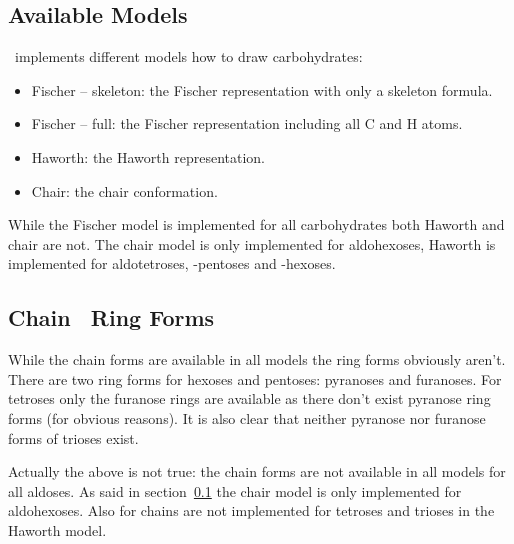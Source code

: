 \documentclass[load-preamble+,scrartcl={DIV10}]{cnltx-doc}
\begin{document}
\subsection{Available Models}\label{sec:available-models}

\carbohydrates\ implements different models how to draw carbohydrates:
\begin{itemize}
  \item Fischer -- skeleton: the Fischer representation with only a skeleton
    formula.
  \item Fischer -- full: the Fischer representation including all C and H
    atoms.
  \item Haworth: the Haworth representation.
  \item Chair: the chair conformation.
\end{itemize}

While the Fischer model is implemented for all carbohydrates both Haworth and
chair are not.  The chair model is only implemented for aldohexoses, Haworth
is implemented for aldotetroses, -pentoses and -hexoses.

\begin{example}
  \glucose[model={fischer=skeleton}]
  \glucose[model={fischer=full}]
  \setatomsep{2.5em}
  \glucose[model=haworth]
  \glucose[model=chair]
\end{example}

\subsection{Chain \vs\ Ring Forms}

While the chain forms are available in all models the ring forms obviously
aren't.  There are two ring forms for hexoses and pentoses: pyranoses and
furanoses.  For tetroses only the furanose rings are available as there don't
exist pyranose ring forms (for obvious reasons).  It is also clear that
neither pyranose nor furanose forms of trioses exist.

\begin{example}
  \setatomsep{2.5em}
  \glucose[model=haworth,ring]
  \ribose[model=haworth,ring]
  \threose[model=haworth,ring]
\end{example}

Actually the above is not true: the chain forms are not available in all
models for all aldoses.  As said in section~\ref{sec:available-models} the
chair model is only implemented for aldohexoses.  Also for chains are not
implemented for tetroses and trioses in the Haworth model.
\end{document}
